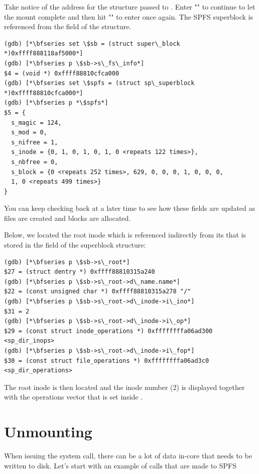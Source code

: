 \noindent
Take notice of the address for the  structure passed to . Enter "" to continue to let the mount complete and then hit "" to enter  once again. The SPFS superblock is referenced from the  field of the  structure.

\begin{lstlisting}
(gdb) [*\bfseries set \$sb = (struct super\_block *)0xffff888118af5000*]
(gdb) [*\bfseries p \$sb->s\_fs\_info*]
$4 = (void *) 0xffff88810cfca000
(gdb) [*\bfseries set \$spfs = (struct sp\_superblock *)0xffff88810cfca000*]
(gdb) [*\bfseries p *\$spfs*]
$5 = {
  s_magic = 124,
  s_mod = 0,
  s_nifree = 1,
  s_inode = {0, 1, 0, 1, 0, 1, 0 <repeats 122 times>},
  s_nbfree = 0,
  s_block = {0 <repeats 252 times>, 629, 0, 0, 0, 1, 0, 0, 0, 
  1, 0 <repeats 499 times>}
}
\end{lstlisting}

\noindent
You can keep checking back at a later time to see how these fields are updated as files are created and blocks are allocated.

Below, we located the root inode which is referenced indirectly from its  that is stored in the  field of the superblock structure:

\begin{lstlisting}
(gdb) [*\bfseries p \$sb->s\_root*]
$27 = (struct dentry *) 0xffff88810315a240
(gdb) [*\bfseries p \$sb->s\_root->d\_name.name*]
$22 = (const unsigned char *) 0xffff88810315a278 "/"
(gdb) [*\bfseries p \$sb->s\_root->d\_inode->i\_ino*]
$31 = 2
(gdb) [*\bfseries p \$sb->s\_root->d\_inode->i\_op*]
$29 = (const struct inode_operations *) 0xffffffffa06ad300 <sp_dir_inops>
(gdb) [*\bfseries p \$sb->s\_root->d\_inode->i\_fop*]
$30 = (const struct file_operations *) 0xffffffffa06ad3c0 <sp_dir_operations>
\end{lstlisting}

\noindent
The root inode is then located and the inode number (2) is displayed together with the operations vector that is set inside .


\section{Unmounting}

When issuing the  system call, there can be a lot of data in-core that needs to be written to disk. Let's start with an example of calls that are made to SPFS

